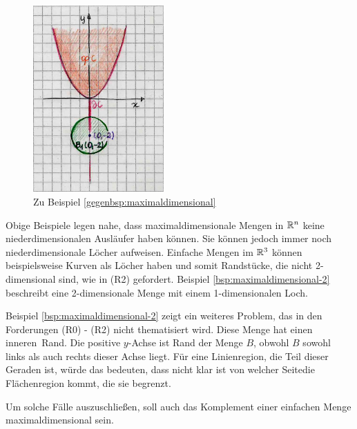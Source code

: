     
    \begin{figure}[ht]
        \centering
        \includegraphics[width=5cm]{gfx/nicht-maxdim.png}
        \caption{Zu Beispiel \ref{gegenbsp:maximaldimensional}}
        \label{fig:nicht-maxdim}
    \end{figure}

    Obige
    Beispiele legen nahe, dass maximaldimensionale Mengen in $\mathbb{R}^n$ keine niederdimensionalen Ausläufer haben können.
    Sie können jedoch immer noch niederdimensionale Löcher aufweisen.
    Einfache Mengen im $\mathbb{R}^3$ können beispielsweise Kurven als Löcher haben und somit Randstücke, die nicht 2-dimensional sind, wie in (R2) gefordert. 
    Beispiel \ref{bsp:maximaldimensional-2} beschreibt eine 2-dimensionale Menge mit einem 1-dimensionalen Loch.
    
    Beispiel \ref{bsp:maximaldimensional-2} zeigt ein weiteres Problem, das in den Forderungen (R0) - (R2) nicht thematisiert wird. Diese Menge hat einen \glqq inneren\grqq\ Rand. Die positive $y$-Achse ist Rand der Menge $B$, obwohl $B$ sowohl links als auch rechts dieser Achse liegt. Für eine Linienregion, die Teil dieser Geraden ist, würde das bedeuten, dass nicht klar ist \glqq von welcher Seite\grqq die Flächenregion kommt, die sie begrenzt.
    
    Um
    solche Fälle auszuschließen, soll auch das Komplement einer einfachen Menge maximaldimensional sein.

